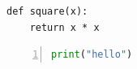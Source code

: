 \documentclass{article}
\begin{document}
\begin{verbatim}
def square(x):
    return x * x
\end{verbatim}
\begin{lstlisting}[language=Python, numbers=left]
print("hello")
\end{lstlisting}
\end{document}
